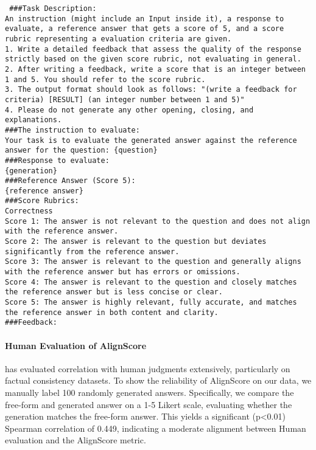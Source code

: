 \texttt{
\#\#\#Task Description:\\
An instruction (might include an Input inside it), a response to evaluate, a reference answer that gets a score of 5, and a score rubric representing a evaluation criteria are given.\\
1. Write a detailed feedback that assess the quality of the response strictly based on the given score rubric, not evaluating in general.\\
2. After writing a feedback, write a score that is an integer between 1 and 5. You should refer to the score rubric.\\
3. The output format should look as follows: "(write a feedback for criteria) [RESULT] (an integer number between 1 and 5)"\\
4. Please do not generate any other opening, closing, and explanations.\\
\#\#\#The instruction to evaluate:\\
Your task is to evaluate the generated answer against the reference answer for the question: \{question\}\\
\#\#\#Response to evaluate:\\
\{generation\}\\
\#\#\#Reference Answer (Score 5):\\
\{reference answer\}\\
\#\#\#Score Rubrics:\\
Correctness\\
Score 1: The answer is not relevant to the question and does not align with the reference answer.\\
Score 2: The answer is relevant to the question but deviates significantly from the reference answer.\\
Score 3: The answer is relevant to the question and generally aligns with the reference answer but has errors or omissions.\\
Score 4: The answer is relevant to the question and closely matches the reference answer but is less concise or clear.\\
Score 5: The answer is highly relevant, fully accurate, and matches the reference answer in both content and clarity.\\
\#\#\#Feedback:
}

\paragraph{Human Evaluation of AlignScore}
\citet{zha-etal-2023-alignscore} has evaluated correlation with human judgments extensively, particularly on factual consistency datasets. To show the reliability of AlignScore on our data, we manually label 100 randomly generated answers. Specifically, we compare the free-form and generated answer on a 1-5 Likert scale, evaluating whether the generation matches the free-form answer. This yields a significant (p<0.01) Spearman correlation of 0.449, indicating a moderate alignment between Human evaluation and the AlignScore metric.